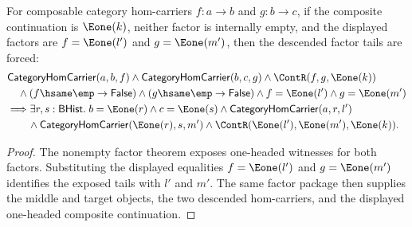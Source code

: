 \begin{theorem}
\label{thm:category-comp-nonempty-e1-morphism-factor-tail-unique}
For composable category hom-carriers $f:a\to b$ and $g:b\to c$, if the
composite continuation is $\Eone(k)$, neither factor is internally empty, and
the displayed factors are $f=\Eone(l')$ and $g=\Eone(m')$, then the descended
factor tails are forced:
$$
\begin{aligned}
&\mathsf{CategoryHomCarrier}(a,b,f)\land
\mathsf{CategoryHomCarrier}(b,c,g)\land
\ContR(f,g,\Eone(k))\\
&\quad\land (f\hsame\emp\to\mathsf{False})\land
(g\hsame\emp\to\mathsf{False})\land f=\Eone(l')\land g=\Eone(m')\\
&\Longrightarrow
\exists r,s:\mathsf{BHist}.\;
b=\Eone(r)\land c=\Eone(s)\land
\mathsf{CategoryHomCarrier}(a,r,l')\\
&\qquad\land
\mathsf{CategoryHomCarrier}(\Eone(r),s,m')\land
\ContR(\Eone(l'),\Eone(m'),\Eone(k)).
\end{aligned}
$$
\end{theorem}
\begin{proof}
The nonempty factor theorem exposes one-headed witnesses for both factors.
Substituting the displayed equalities $f=\Eone(l')$ and $g=\Eone(m')$ identifies
the exposed tails with $l'$ and $m'$. The same factor package then supplies the
middle and target objects, the two descended hom-carriers, and the displayed
one-headed composite continuation.
\end{proof}

